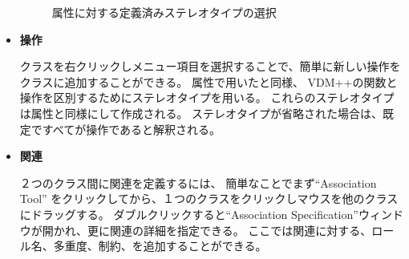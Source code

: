 \documentclass[\pformat,12pt]{jarticle}
\newcommand{\vdmpp}{VDM++}
\begin{document}
\begin{itemize}
\begin{figure}[htb]
\begin{center}
\mbox{}
\caption{属性に対する定義済みステレオタイプの選択　\label{fig:stereotype}}
\end{center}
\end{figure}

\item {\bf 操作}


  クラスを右クリックしメニュー項目を選択することで、簡単に新しい操作をクラスに追加することができる。
属性で用いたと同様、 \vdmpp{}の関数と操作を区別するためにステレオタイプを用いる。
これらのステレオタイプは属性と同様にして作成される。
ステレオタイプが省略された場合は、既定ですべてが操作であると解釈される。

\item{\bf 関連}
  
２つのクラス間に関連を定義するには、 簡単なことでまず``Association Tool'' をクリックしてから、１つのクラスをクリックしマウスを他のクラスにドラッグする。
ダブルクリックすると``Association Specification''ウィンドウが開かれ、更に関連の詳細を指定できる。
ここでは関連に対する、ロール名、多重度、制約、を追加することができる。


\end{itemize}
\end{document}

